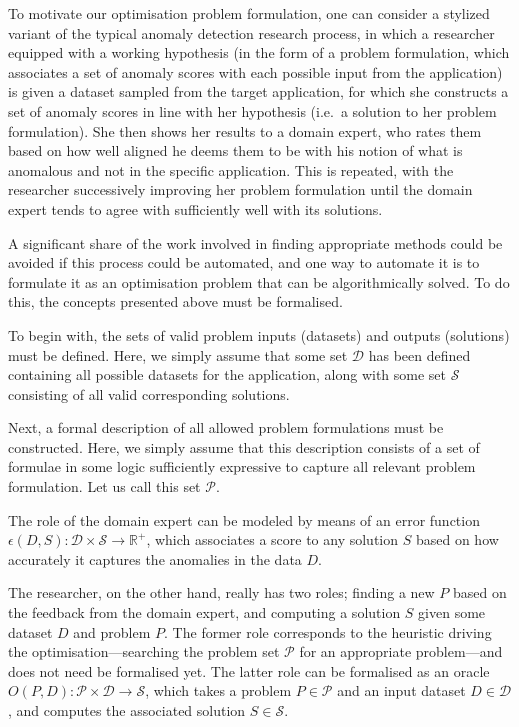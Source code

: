To motivate our optimisation problem formulation, one can consider a stylized variant of the typical anomaly detection research process, in which a researcher equipped with a working hypothesis (in the form of a problem formulation, which associates a set of anomaly scores with each possible input from the application) is given a dataset sampled from the target application, for which she constructs a set of anomaly scores in line with her hypothesis (i.e.\ a solution to her problem formulation). She then shows her results to a domain expert, who rates them based on how well aligned he deems them to be with his notion of what is anomalous and not in the specific application. This is repeated, with the researcher successively improving her problem formulation until the domain expert tends to agree with sufficiently well with its solutions.

A significant share of the work involved in finding appropriate methods could be avoided if this process could be automated, and one way to automate it is to formulate it as an optimisation problem that can be algorithmically solved. To do this, the concepts presented above must be formalised.

To begin with, the sets of valid problem inputs (datasets) and outputs (solutions) must be defined. Here, we simply assume that some set $\mathcal{D}$ has been defined containing all possible datasets for the application, along with some set $\mathcal{S}$ consisting of all valid corresponding solutions.

Next, a formal description of all allowed problem formulations must be constructed. Here, we simply assume that this description consists of a set of formulae in some logic sufficiently expressive to capture all relevant problem formulation. Let us call this set $\mathcal{P}$.

The role of the domain expert can be modeled by means of an error function $\epsilon(D, S): \mathcal{D} \times \mathcal{S} \rightarrow \mathbb{R}^+$, which associates a score to any solution $S$ based on how accurately it captures the anomalies in the data $D$.

The researcher, on the other hand, really has two roles; finding a new $P$ based on the feedback from the domain expert, and computing a solution $S$ given some dataset $D$ and problem $P$. The former role corresponds to the heuristic driving the optimisation---searching the problem set $\mathcal{P}$ for an appropriate problem---and does not need be formalised yet. The latter role can be formalised as an oracle $O(P, D): \mathcal{P} \times \mathcal{D} \rightarrow \mathcal{S}$, which takes a problem $P \in \mathcal{P}$ and an input dataset $D \in \mathcal{D}$, and computes the associated solution $S \in \mathcal{S}$.

